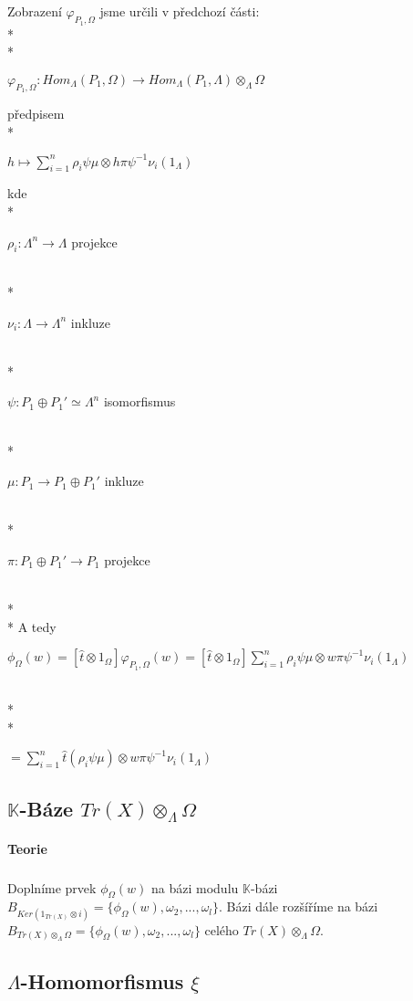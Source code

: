 \documentclass[7pt]{article}
\begin{document}
         \subparagraph{} Zobrazení $\varphi_{P_1,\Omega}$ jsme určili v 
         předchozí části: \\*\\*
         \centerline{$\varphi_{P_1,\Omega}:Hom_\Lambda(P_1,\Omega)\rightarrow Hom_\Lambda(P_1,\Lambda)\otimes_\Lambda \Omega$} 
         předpisem \\*
         \centerline{$h\mapsto\sum_{i=1}^n \rho_i\psi\mu\otimes h\pi\psi^{-1}\nu_i(1_\Lambda)$}
         kde \\*
         \centerline{$ \rho_i: \Lambda^n\rightarrow\Lambda $ projekce} \\*
         \centerline{$ \nu_i: \Lambda\rightarrow \Lambda^n $ inkluze} \\*
         \centerline{$ \psi: P_1\oplus P_1' \simeq \Lambda^n $ isomorfismus} \\*
         \centerline{$ \mu: P_1\rightarrow P_1\oplus P_1'$ inkluze} \\*
         \centerline{$ \pi: P_1\oplus P_1'\rightarrow P_1$ projekce} \\*\\*
         A tedy 
         \centerline{$\phi_\Omega(w)
         =[\hat{t}\otimes1_\Omega]\varphi_{P_1, \Omega}(w)
         =[\hat{t}\otimes1_\Omega]\sum_{i=1}^n \rho_i\psi\mu\otimes w\pi\psi^{-1}\nu_i(1_\Lambda)
         $} \\*\\*         
         \centerline{$
         =\sum_{i=1}^n \hat{t}(\rho_i\psi\mu)\otimes w\pi\psi^{-1}\nu_i(1_\Lambda)
         $}
              
    \subsection{$\mathbb{K}$-Báze $Tr(X)\otimes_\Lambda\Omega$}
      \paragraph{Teorie}
         \subparagraph{} Doplníme prvek $\phi_\Omega(w)$ na bázi modulu $\mathbb{K}$-bázi 
         $B_{Ker(1_{Tr(X)}\otimes i)}=\{\phi_\Omega(w), 
         \omega_2,...,\omega_l\}$. Bázi dále rozšíříme na bázi $B_{Tr(X)\otimes_\Lambda\Omega}=\{\phi_\Omega(w), 
         \omega_2,...,\omega_l\}$ celého $Tr(X)\otimes_\Lambda\Omega$.

    \subsection{$\Lambda$-Homomorfismus $\xi$}
\end{document}
